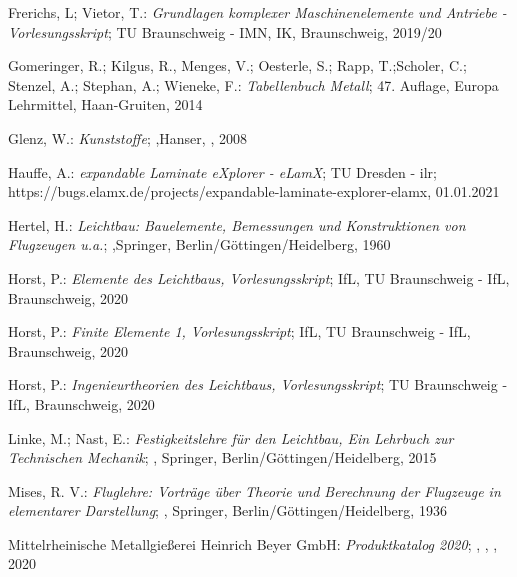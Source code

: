 \begingroup
\renewcommand{\section}[2]{}%
\begin{thebibliography}{99}  
	
	Frerichs, L; Vietor, T.:
	\textit{\glqq Grundlagen komplexer Maschinenelemente und Antriebe - Vorlesungsskript\grqq};
	TU Braunschweig - IMN, IK, Braunschweig, 2019/20
	
	Gomeringer, R.; Kilgus, R., Menges, V.; Oesterle, S.; Rapp, T.;Scholer, C.; Stenzel, A.; Stephan, A.; Wieneke, F.:
	\textit{\glqq Tabellenbuch Metall\grqq};
	47. Auflage, Europa Lehrmittel, Haan-Gruiten, 2014 
	
	Glenz, W.:
	\textit{\glqq Kunststoffe\grqq};
	,Hanser, , 2008
	
	Hauffe, A.:
	\textit{\glqq expandable Laminate eXplorer - eLamX\grqq};
	TU Dresden - ilr; https://bugs.elamx.de/projects/expandable-laminate-explorer-elamx, 01.01.2021
	
	Hertel, H.:
	\textit{\glqq Leichtbau: Bauelemente, Bemessungen und Konstruktionen von Flugzeugen u.a.\grqq};
	,Springer, Berlin/Göttingen/Heidelberg, 1960 
	
	Horst, P.:
	\textit{\glqq Elemente des Leichtbaus, Vorlesungsskript\grqq};
	IfL, TU Braunschweig - IfL, Braunschweig, 2020 
	
	Horst, P.:
	\textit{\glqq Finite Elemente 1, Vorlesungsskript\grqq};
	IfL, TU Braunschweig  - IfL, Braunschweig, 2020 
	
	Horst, P.:
	\textit{\glqq Ingenieurtheorien des Leichtbaus, Vorlesungsskript\grqq};
	 TU Braunschweig - IfL, Braunschweig, 2020 
	
	Linke, M.; Nast, E.:
	\textit{\glqq Festigkeitslehre für den Leichtbau, Ein Lehrbuch zur Technischen Mechanik\grqq};
	, Springer, Berlin/Göttingen/Heidelberg, 2015
	
	Mises, R. V.:
	\textit{\glqq Fluglehre: Vorträge über Theorie und Berechnung der Flugzeuge in elementarer Darstellung\grqq};
	, Springer, Berlin/Göttingen/Heidelberg, 1936
	
	Mittelrheinische Metallgießerei Heinrich Beyer GmbH:
	\textit{\glqq Produktkatalog 2020\grqq};
	, , , 2020
	

\end{thebibliography}
